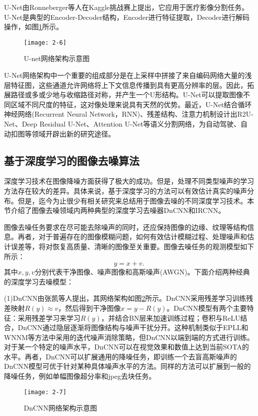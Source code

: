 U-Net由Ronneberger等人在Kaggle挑战赛上提出，它应用于医疗影像分割任务。U-Net是典型的Encoder-Decoder结构，Encoder进行特征提取，Decoder进行解码操作，如图\ref{fig:2-6}所示。
\begin{figure}[!htbp]
	\centering
	\texttt{[image: 2-6]}
	\caption{U-net网络架构示意图}\label{fig:2-6}
\end{figure}

U-Net网络架构中一个重要的组成部分是在上采样中拼接了来自编码网络大量的浅层特征图，这些通道允许网络将上下文信息传播到具有更高分辨率的层。因此，拓展路径或多或少地与收缩路径对称，并产生一个U形结构。U-Net可以提取图像不同区域不同尺度的特征，这对像处理来说具有天然的优势。最近，U-Net结合循环神经网络(Recurrent Neural Network，RNN)、残差结构、注意力机制设计出R2U-Net、Deep Residual U-Net、Attention U-Net等语义分割网络，为自动驾驶、自动扣图等领域开辟出新的研究途径。

\subsection{基于深度学习的图像去噪算法}
深度学习技术在图像降噪方面获得了极大的成功。但是，处理不同类型噪声的学习方法存在较大的差异。具体来说，基于深度学习的方法可以有效估计真实的噪声分布\supercite{Chunwei}。但是，迄今为止很少有相关研究来总结用于图像去噪的不同深度学习技术。本节介绍了图像去噪领域内两种典型的深度学习去噪器DnCNN和IRCNN。

图像去噪任务要求在尽可能去除噪声的同时，还应保持图像的边缘、纹理等结构信息。再者，对于普遍存在的图像模糊问题，如何有效估计模糊过程、处理噪声和估计误差等，将对恢复高质量、清晰的图像至关重要。图像去噪任务的观测模型如下所示：
\begin{equation} \label{equation:2-6}
	y = x + v.
\end{equation}
其中$x,y,v$分别代表干净图像、噪声图像和高斯噪声(AWGN)。下面介绍两种经典的深度学习去噪模型：

(1)DnCNN由张凯等人提出，其网络架构如图\ref{fig:2-7}所示\supercite{Kai}。DnCNN采用残差学习训练残差映射$R(y)\approx{v}$，然后得到干净图像$x=y-R(y)$。DnCNN模型有两个主要特征：采用残差学习来学习$R(y)$，并结合BN层来加速训练过程；卷积与ReLU结合，DnCNN通过隐层逐渐将图像结构与噪声干扰分开。这种机制类似于EPLL和WNNM等方法中采用的迭代噪声消除策略，但DnCNN以端到端的方式进行训练。对于某一个特定的噪声水平，DnCNN可以在视觉效果和数值上达到当前SOTA的水平。再者，DnCNN可以扩展通用的降噪任务，即训练一个去盲高斯噪声的DnCNN模型可优于针对某种具体噪声水平的方法。同样的方法可以扩展到一般的降噪任务，例如单幅图像超分率和jpeg去块任务。
\begin{figure}[!htbp]
	\centering
	\texttt{[image: 2-7]}
	\caption{DnCNN网络架构示意图}\label{fig:2-7}
\end{figure}

